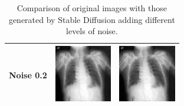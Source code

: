 \begin{table}[H]
\begin{tabularx}{\linewidth}{@{}>{\centering\arraybackslash}m{2cm}>{\centering\arraybackslash}X>{\centering\arraybackslash}X@{}}
\midrule
Noise 0.2 & 
\includegraphics[valign=M,width=\linewidth,height=2.5cm,keepaspectratio]{main/content/images/sd_noise/noise_0.2_58136.jpg} & \includegraphics[valign=M,width=\linewidth,height=2.5cm,keepaspectratio]{main/content/images/sd_noise/noise_0.2_58136.jpg} \\
\bottomrule
\end{tabularx}
\caption{Comparison of original images with those generated by Stable Diffusion adding different levels of noise.}
\label{tab:image_comparison_two_originals_full_width}
\end{table}

